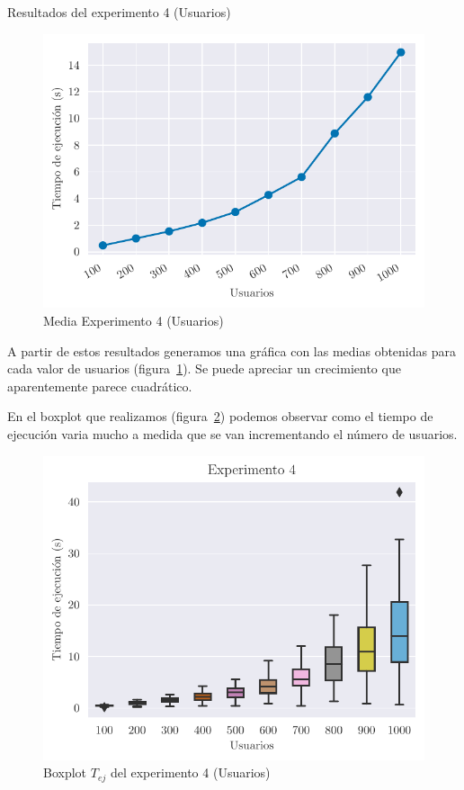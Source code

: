 \begin{table}[H]
    \caption{Resultados del experimento 4 (Usuarios)}%
    \label{tab:ex4u}
    \begin{center}
    
    \end{center}
\end{table}


\begin{figure}[H]
    \centering
    \includegraphics{include/plots/ex4_u_mean_time.pdf}
    \caption{Media Experimento 4 (Usuarios)}%
    \label{fig:ex4u_mean}
\end{figure}

A partir de estos resultados generamos una gráfica con las medias obtenidas para cada valor de usuarios (figura~\ref{fig:ex4u_mean}). Se puede apreciar un crecimiento que aparentemente parece cuadrático.

En el boxplot que realizamos (figura~\ref{fig:ex4u}) podemos observar como el tiempo de ejecución
varia mucho a medida que se van incrementando el número de usuarios.

\begin{figure}[H]
    \centering
    \includegraphics{include/plots/ex4_u_time_bplot.pdf}
    \caption{Boxplot $T_{ej}$ del experimento 4 (Usuarios)}%
    \label{fig:ex4u}
\end{figure}

